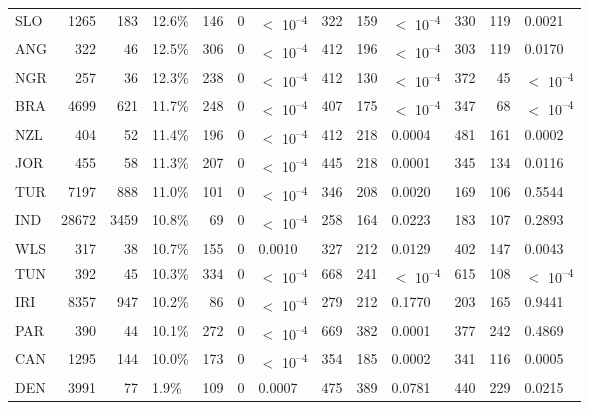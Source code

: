 \begin{tabular}[t]{lrrlrrlrrlrrl}
SLO & 1265 & 183 & 12.6\% & 146 & 0 & $<$ 10\textsuperscript{--4} & 322 & 159 & $<$ 10\textsuperscript{--4} & 330 & 119 & 0.0021\\
ANG & 322 & 46 & 12.5\% & 306 & 0 & $<$ 10\textsuperscript{--4} & 412 & 196 & $<$ 10\textsuperscript{--4} & 303 & 119 & 0.0170\\
NGR & 257 & 36 & 12.3\% & 238 & 0 & $<$ 10\textsuperscript{--4} & 412 & 130 & $<$ 10\textsuperscript{--4} & 372 & 45 & $<$ 10\textsuperscript{--4}\\
BRA & 4699 & 621 & 11.7\% & 248 & 0 & $<$ 10\textsuperscript{--4} & 407 & 175 & $<$ 10\textsuperscript{--4} & 347 & 68 & $<$ 10\textsuperscript{--4}\\
NZL & 404 & 52 & 11.4\% & 196 & 0 & $<$ 10\textsuperscript{--4} & 412 & 218 & 0.0004 & 481 & 161 & 0.0002\\
JOR & 455 & 58 & 11.3\% & 207 & 0 & $<$ 10\textsuperscript{--4} & 445 & 218 & 0.0001 & 345 & 134 & 0.0116\\
TUR & 7197 & 888 & 11.0\% & 101 & 0 & $<$ 10\textsuperscript{--4} & 346 & 208 & 0.0020 & 169 & 106 & 0.5544\\
IND & 28672 & 3459 & 10.8\% & 69 & 0 & $<$ 10\textsuperscript{--4} & 258 & 164 & 0.0223 & 183 & 107 & 0.2893\\
WLS & 317 & 38 & 10.7\% & 155 & 0 & 0.0010 & 327 & 212 & 0.0129 & 402 & 147 & 0.0043\\
TUN & 392 & 45 & 10.3\% & 334 & 0 & $<$ 10\textsuperscript{--4} & 668 & 241 & $<$ 10\textsuperscript{--4} & 615 & 108 & $<$ 10\textsuperscript{--4}\\
IRI & 8357 & 947 & 10.2\% & 86 & 0 & $<$ 10\textsuperscript{--4} & 279 & 212 & 0.1770 & 203 & 165 & 0.9441\\
PAR & 390 & 44 & 10.1\% & 272 & 0 & $<$ 10\textsuperscript{--4} & 669 & 382 & 0.0001 & 377 & 242 & 0.4869\\
CAN & 1295 & 144 & 10.0\% & 173 & 0 & $<$ 10\textsuperscript{--4} & 354 & 185 & 0.0002 & 341 & 116 & 0.0005\\
DEN & 3991 & 77 & 1.9\% & 109 & 0 & 0.0007 & 475 & 389 & 0.0781 & 440 & 229 & 0.0215\\
\bottomrule
\end{tabular}
